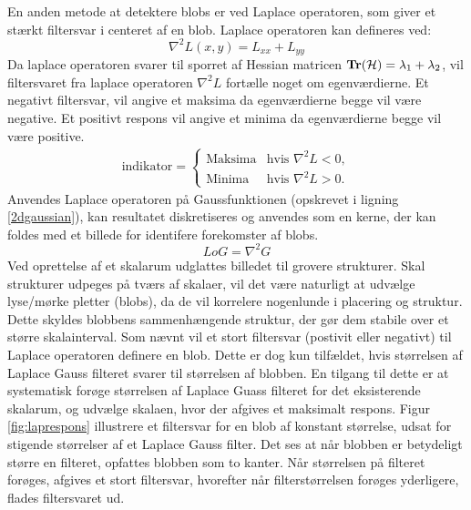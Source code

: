        \vspace{-2.7em}
\noindent
En anden metode at detektere blobs er ved Laplace operatoren, som giver et stærkt filtersvar i centeret af en blob. Laplace operatoren kan defineres ved:
$$
\nabla^2L(x,y) = L_{xx}+L_{yy}
$$
Da laplace operatoren svarer til sporret af Hessian matricen $\bold{Tr}(\mathcal{H}) = \lambda_1 + \lambda_2$, vil filtersvaret fra laplace operatoren $\nabla^2L$ fortælle noget om egenværdierne. Et negativt filtersvar, vil angive et maksima da egenværdierne begge vil være negative. Et positivt respons vil angive et minima da egenværdierne begge vil være positive.
\begin{equation}
\begin{split}
\text{indikator} = 
\begin{cases}
\text{Maksima}& \text{hvis } \nabla^2L < 0,  \\
\text{Minima} & \text{hvis } \nabla^2L > 0.
\end{cases}
\end{split}
\label{laplaceblob}
\end{equation}
Anvendes Laplace operatoren på Gaussfunktionen (opskrevet i ligning \eqref{2dgaussian}), kan resultatet diskretiseres og anvendes som en kerne, der kan foldes med et billede for identifere forekomster af blobs.
\begin{equation}
LoG= \nabla^2 G
\label{lap}
\end{equation}
Ved oprettelse af et skalarum udglattes billedet til grovere strukturer. 
Skal strukturer udpeges på tværs af skalaer, vil det være naturligt at udvælge lyse/mørke pletter (blobs), da de vil korrelere nogenlunde i placering og struktur. Dette skyldes blobbens sammenhængende struktur, der gør dem stabile over et større skalainterval. Som nævnt vil et stort filtersvar (postivit eller negativt) til Laplace operatoren definere en blob. Dette er dog kun tilfældet, hvis størrelsen af Laplace Gauss filteret svarer til størrelsen af blobben. En tilgang til dette er at systematisk forøge størrelsen af Laplace Guass filteret for det eksisterende skalarum, og udvælge skalaen, hvor der afgives et maksimalt respons. Figur \ref{fig:laprespons} illustrere et filtersvar for en blob af konstant størrelse, udsat for stigende størrelser af et Laplace Gauss filter. Det ses at når blobben er betydeligt større en filteret, opfattes blobben som to kanter. Når størrelsen på filteret forøges, afgives et stort filtersvar, hvorefter når filterstørrelsen forøges yderligere, flades filtersvaret ud.
